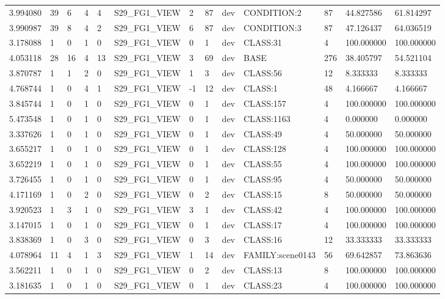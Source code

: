 \begin{tabular}{lllllllllllll}
3.994080 & 39 & 6 & 4 & 4 & S29\_FG1\_VIEW & 2 & 87 & dev & CONDITION:2 & 87 & 44.827586 & 61.814297 \\
3.990987 & 39 & 8 & 4 & 2 & S29\_FG1\_VIEW & 6 & 87 & dev & CONDITION:3 & 87 & 47.126437 & 64.036519 \\
3.178088 & 1 & 0 & 1 & 0 & S29\_FG1\_VIEW & 0 & 1 & dev & CLASS:31 & 4 & 100.000000 & 100.000000 \\
4.053118 & 28 & 16 & 4 & 13 & S29\_FG1\_VIEW & 3 & 69 & dev & BASE & 276 & 38.405797 & 54.521104 \\
3.870787 & 1 & 1 & 2 & 0 & S29\_FG1\_VIEW & 1 & 3 & dev & CLASS:56 & 12 & 8.333333 & 8.333333 \\
4.768744 & 1 & 0 & 4 & 1 & S29\_FG1\_VIEW & -1 & 12 & dev & CLASS:1 & 48 & 4.166667 & 4.166667 \\
3.845744 & 1 & 0 & 1 & 0 & S29\_FG1\_VIEW & 0 & 1 & dev & CLASS:157 & 4 & 100.000000 & 100.000000 \\
5.473548 & 1 & 0 & 1 & 0 & S29\_FG1\_VIEW & 0 & 1 & dev & CLASS:1163 & 4 & 0.000000 & 0.000000 \\
3.337626 & 1 & 0 & 1 & 0 & S29\_FG1\_VIEW & 0 & 1 & dev & CLASS:49 & 4 & 50.000000 & 50.000000 \\
3.655217 & 1 & 0 & 1 & 0 & S29\_FG1\_VIEW & 0 & 1 & dev & CLASS:128 & 4 & 100.000000 & 100.000000 \\
3.652219 & 1 & 0 & 1 & 0 & S29\_FG1\_VIEW & 0 & 1 & dev & CLASS:55 & 4 & 100.000000 & 100.000000 \\
3.726455 & 1 & 0 & 1 & 0 & S29\_FG1\_VIEW & 0 & 1 & dev & CLASS:95 & 4 & 50.000000 & 50.000000 \\
4.171169 & 1 & 0 & 2 & 0 & S29\_FG1\_VIEW & 0 & 2 & dev & CLASS:15 & 8 & 50.000000 & 50.000000 \\
3.920523 & 1 & 3 & 1 & 0 & S29\_FG1\_VIEW & 3 & 1 & dev & CLASS:42 & 4 & 100.000000 & 100.000000 \\
3.147015 & 1 & 0 & 1 & 0 & S29\_FG1\_VIEW & 0 & 1 & dev & CLASS:17 & 4 & 100.000000 & 100.000000 \\
3.838369 & 1 & 0 & 3 & 0 & S29\_FG1\_VIEW & 0 & 3 & dev & CLASS:16 & 12 & 33.333333 & 33.333333 \\
4.078964 & 11 & 4 & 1 & 3 & S29\_FG1\_VIEW & 1 & 14 & dev & FAMILY:scene0143 & 56 & 69.642857 & 73.863636 \\
3.562211 & 1 & 0 & 1 & 0 & S29\_FG1\_VIEW & 0 & 2 & dev & CLASS:13 & 8 & 100.000000 & 100.000000 \\
3.181635 & 1 & 0 & 1 & 0 & S29\_FG1\_VIEW & 0 & 1 & dev & CLASS:23 & 4 & 100.000000 & 100.000000 \\

\end{tabular}
